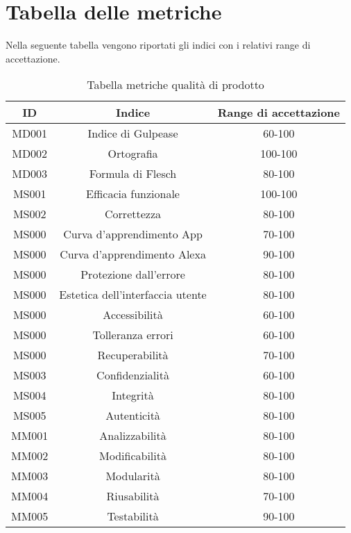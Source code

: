\section{Tabella delle metriche}
Nella seguente tabella vengono riportati gli indici con i relativi range di accettazione.\\
\begin{table}[h]
    \begin{center}
      \begin{tabular}{|c|c|c|}
        \hline
        \textbf{ID} & \textbf{Indice}       & \textbf{Range di accettazione}\\
        \hline
        MD001       & Indice di Gulpease    & 60-100\\
        MD002       & Ortografia            & 100-100\\
        MD003       & Formula di Flesch     & 80-100\\\hline
        MS001       & Efficacia funzionale  & 100-100\\
        MS002       & Correttezza  			& 80-100\\
        MS000       & Curva d'apprendimento App & 70-100\\
        MS000       & Curva d'apprendimento Alexa   & 90-100\\
        MS000       & Protezione dall'errore  & 80-100\\
        MS000       & Estetica dell'interfaccia utente  & 80-100\\
        MS000       & Accessibilità			  & 60-100\\
        MS000       & Tolleranza errori    & 60-100\\
        MS000       & Recuperabilità			& 70-100\\
        MS003       & Confidenzialità 	 	& 60-100\\
        MS004       & Integrità  			& 80-100\\
        MS005       & Autenticità		    & 80-100\\\hline
        MM001       & Analizzabilità	    & 80-100\\
        MM002       & Modificabilità		& 80-100\\
        MM003       & Modularità		    & 80-100\\
        MM004       & Riusabilità			& 70-100\\
		MM005       & Testabilità			& 90-100\\
        \hline
      \end{tabular}
      \caption{Tabella metriche qualità di prodotto}
    \end{center}
\end{table}